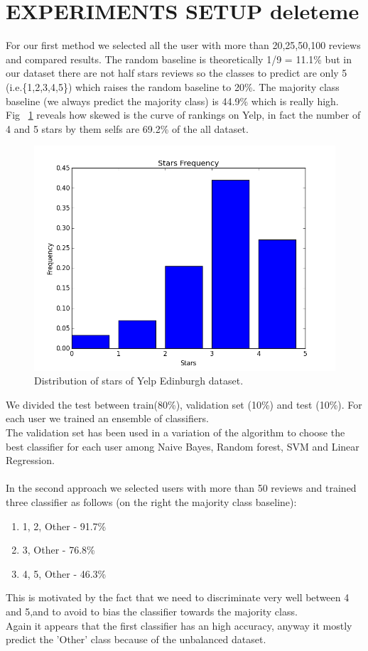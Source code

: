 \documentclass[11pt]{article}
\begin{document}
\section{EXPERIMENTS SETUP deleteme}
For our first method we selected all the user with more than 20,25,50,100 reviews and compared results. The random baseline is theoretically 1/9 = 11.1\% but in our dataset there are not half stars reviews so the classes to predict are only 5 (i.e.\{1,2,3,4,5\}) which raises the random baseline to 20\%.  The majority class baseline (we always predict the majority class) is 44.9\% which is really high.\\
Fig ~\ref{histStars} reveals how skewed is the curve of rankings on Yelp, in fact the number of 4 and 5 stars by them selfs are 69.2\% of the all dataset.
\begin{figure}[thpb]
	\centering
	\includegraphics[scale=0.4]{img/starsFrequency.png}
	\caption{Distribution of stars of Yelp Edinburgh dataset.}
	\label{histStars}
\end{figure}
We divided the test between train(80\%), validation set (10\%) and test (10\%).
For each user we trained an ensemble of classifiers.\\
The validation set has been used in a variation of the algorithm to choose the best classifier for each user among Naive Bayes, Random forest, SVM and Linear Regression.\\\\
In the second approach we selected users with more than 50 reviews and trained three classifier as follows (on the right the majority class baseline):
\begin{enumerate}
	\item 1, 2, Other - 91.7\%
	\item 3, Other - 76.8\%
	\item 4, 5, Other - 46.3\%
\end{enumerate}
This is motivated by the fact that we need to discriminate very well between 4 and 5,and to avoid to bias the classifier towards the majority class.\\
Again it appears that the first classifier has an high accuracy, anyway it mostly predict the 'Other' class because of the unbalanced dataset.\\
\end{document}
